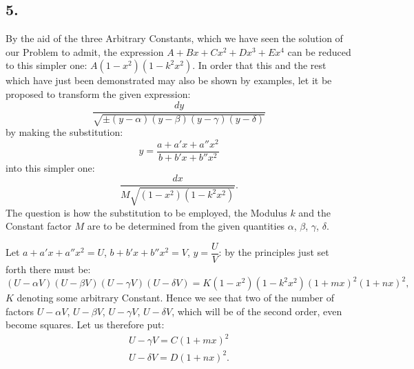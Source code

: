 \documentclass{article}
\begin{document}
\subsection*{5.}

By the aid of the three Arbitrary Constants, which we have seen the solution of our Problem to admit, the expression $A+Bx+Cx^{2}+Dx^{3}+Ex^{4}$ can be reduced to this simpler one: $A(1-x^{2})(1-k^{2}x^{2})$. In order that this and the rest which have just been demonstrated may also be shown by examples, let it be proposed to transform the given expression:
\[
\frac{dy}{\sqrt{\pm(y-\alpha)(y-\beta)(y-\gamma)(y-\delta)}}
\]
by making the substitution:
\[
y=\frac{a+a'x+a''x^{2}}{b+b'x+b''x^{2}}
\]
into this simpler one:
\[
\frac{dx}{M\sqrt{(1-x^{2})(1-k^{2}x^{2})}}.
\]
The question is how the substitution to be employed, the Modulus $k$ and the Constant factor $M$ are to be determined from the given quantities $\alpha$, $\beta$, $\gamma$, $\delta$.

Let $a+a'x+a''x^{2}=U$, $b+b'x+b''x^{2}=V$, $y=\dfrac{U}{V}$: by the principles just set forth there must be:
\[
(U-\alpha V)(U-\beta V)(U-\gamma V)(U-\delta V)=K(1-x^{2})(1-k^{2}x^{2})(1+mx)^{2}(1+nx)^{2},
\]
$K$ denoting some arbitrary Constant. Hence we see that two of the number of factors $U-\alpha V$, $U-\beta V$, $U-\gamma V$, $U-\delta V$, which will be of the second order, even become squares. Let us therefore put:
\[
\begin{gathered}
U-\gamma V=C(1+mx)^{2}\\
U-\delta V=D(1+nx)^{2}.
\end{gathered}
\]

\end{document}

